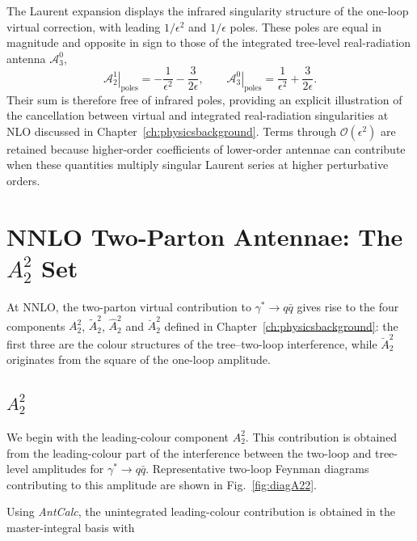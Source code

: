 The Laurent expansion displays the infrared singularity structure of the one-loop virtual correction,
with leading $1/\epsilon^2$ and $1/\epsilon$ poles. These poles are equal in magnitude and opposite in
sign to those of the integrated tree-level real-radiation antenna $\mathcal A_3^0$,
\begin{equation*}
    \left.\mathcal A_2^1\right|_{\mathrm{poles}} = -\frac{1}{\epsilon^2}-\frac{3}{2\epsilon}, \qquad
    \left.\mathcal A_3^0\right|_{\mathrm{poles}} = \frac{1}{\epsilon^2}+\frac{3}{2\epsilon}.
\end{equation*}
Their sum is therefore free of infrared poles, providing an explicit illustration of the cancellation
between virtual and integrated real-radiation singularities at NLO discussed in
Chapter~\ref{ch:physicsbackground}. Terms through $\mathcal O(\epsilon^2)$ are retained because
higher-order coefficients of lower-order antennae can contribute when these quantities multiply
singular Laurent series at higher perturbative orders.


\section{NNLO Two-Parton Antennae: The $A_2^2$ Set}\label{subsec:A22}

At NNLO, the two-parton virtual contribution to $\gamma^*\to q\bar q$ gives rise to the four
components $A_2^2$, $\tilde A_2^2$, $\hat A_2^2$ and $\breve A_2^2$ defined in
Chapter~\ref{ch:physicsbackground}: the first three are the colour structures of the tree--two-loop
interference, while $\breve A_2^2$ originates from the square of the one-loop amplitude.



\subsection{$A_2^2$}\label{subsec:A22lead}

We begin with the leading-colour component $A_2^2$. This contribution is obtained from the
leading-colour part of the interference between the two-loop and tree-level amplitudes for
$\gamma^*\to q\bar q$.
Representative two-loop Feynman diagrams contributing to this amplitude are shown in Fig.~\ref{fig:diagA22}.

Using \textit{AntCalc}, the unintegrated leading-colour contribution is obtained in the
master-integral basis with


